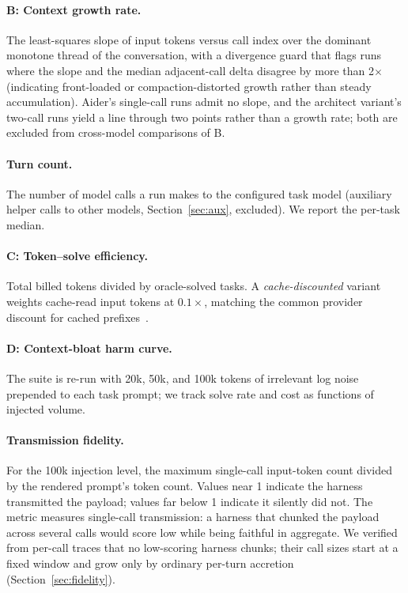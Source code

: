 \documentclass[11pt]{article}
\begin{document}
\paragraph{B: Context growth rate.} The least-squares slope of input tokens versus call index over the dominant monotone thread of the conversation, with a divergence guard that flags runs where the slope and the median adjacent-call delta disagree by more than 2$\times$ (indicating front-loaded or compaction-distorted growth rather than steady accumulation). Aider's single-call runs admit no slope, and the architect variant's two-call runs yield a line through two points rather than a growth rate; both are excluded from cross-model comparisons of B.

\paragraph{Turn count.} The number of model calls a run makes to the configured task model (auxiliary helper calls to other models, Section~\ref{sec:aux}, excluded). We report the per-task median.

\paragraph{C: Token--solve efficiency.} Total billed tokens divided by oracle-solved tasks. A \emph{cache-discounted} variant weights cache-read input tokens at $0.1\times$, matching the common provider discount for cached prefixes~\citep{gim2024promptcache}.

\paragraph{D: Context-bloat harm curve.} The suite is re-run with 20k, 50k, and 100k tokens of irrelevant log noise prepended to each task prompt; we track solve rate and cost as functions of injected volume.

\paragraph{Transmission fidelity.} For the 100k injection level, the maximum single-call input-token count divided by the rendered prompt's token count. Values near 1 indicate the harness transmitted the payload; values far below 1 indicate it silently did not. The metric measures single-call transmission: a harness that chunked the payload across several calls would score low while being faithful in aggregate. We verified from per-call traces that no low-scoring harness chunks; their call sizes start at a fixed window and grow only by ordinary per-turn accretion (Section~\ref{sec:fidelity}).
\end{document}
